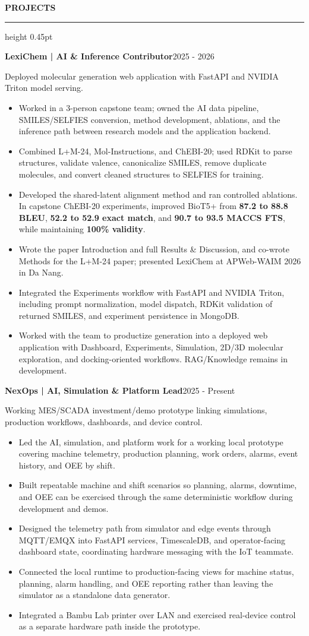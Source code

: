 \documentclass[10pt]{article}
\newcommand{\cvsection}[1]{%
    \vspace{6.2pt}%
    {\color{accent}\bfseries\small #1}\par
    \vspace{2.3pt}%
    {\color{rulegray}\hrule height 0.45pt}\vspace{4.0pt}%
}
\newcommand{\entry}[2]{%
    \textbf{#1}\hfill {\color{muted}\small #2}\par
}
\newcommand{\subentry}[1]{%
    {\color{muted}\small #1}\par
}
\begin{document}
\cvsection{PROJECTS}
\entry{LexiChem | AI \& Inference Contributor}{2025 - 2026}
\subentry{Deployed molecular generation web application with FastAPI and NVIDIA Triton model serving.}
\begin{itemize}
    \item Worked in a 3-person capstone team; owned the AI data pipeline, SMILES/SELFIES conversion, method development, ablations, and the inference path between research models and the application backend.
    \item Combined L+M-24, Mol-Instructions, and ChEBI-20; used RDKit to parse structures, validate valence, canonicalize SMILES, remove duplicate molecules, and convert cleaned structures to SELFIES for training.
    \item Developed the shared-latent alignment method and ran controlled ablations. In capstone ChEBI-20 experiments, improved BioT5+ from \textbf{87.2 to 88.8 BLEU}, \textbf{52.2 to 52.9 exact match}, and \textbf{90.7 to 93.5 MACCS FTS}, while maintaining \textbf{100\% validity}.
    \item Wrote the paper Introduction and full Results \& Discussion, and co-wrote Methods for the L+M-24 paper; presented LexiChem at APWeb-WAIM 2026 in Da Nang.
    \item Integrated the Experiments workflow with FastAPI and NVIDIA Triton, including prompt normalization, model dispatch, RDKit validation of returned SMILES, and experiment persistence in MongoDB.
    \item Worked with the team to productize generation into a deployed web application with Dashboard, Experiments, Simulation, 2D/3D molecular exploration, and docking-oriented workflows. RAG/Knowledge remains in development.
\end{itemize}

\entry{NexOps | AI, Simulation \& Platform Lead}{2025 - Present}
\subentry{Working MES/SCADA investment/demo prototype linking simulations, production workflows, dashboards, and device control.}
\begin{itemize}
    \item Led the AI, simulation, and platform work for a working local prototype covering machine telemetry, production planning, work orders, alarms, event history, and OEE by shift.
    \item Built repeatable machine and shift scenarios so planning, alarms, downtime, and OEE can be exercised through the same deterministic workflow during development and demos.
    \item Designed the telemetry path from simulator and edge events through MQTT/EMQX into FastAPI services, TimescaleDB, and operator-facing dashboard state, coordinating hardware messaging with the IoT teammate.
    \item Connected the local runtime to production-facing views for machine status, planning, alarm handling, and OEE reporting rather than leaving the simulator as a standalone data generator.
    \item Integrated a Bambu Lab printer over LAN and exercised real-device control as a separate hardware path inside the prototype.
\end{itemize}
\end{document}
